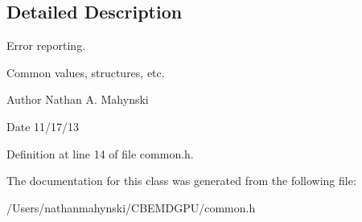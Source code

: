 \subsection{Detailed Description}
Error reporting. 

Common values, structures, etc. \begin{DoxyAuthor}{Author}
Nathan A. Mahynski 
\end{DoxyAuthor}
\begin{DoxyDate}{Date}
11/17/13 
\end{DoxyDate}


Definition at line 14 of file common.\-h.



The documentation for this class was generated from the following file\-:\begin{DoxyCompactItemize}
\item 
/\-Users/nathanmahynski/\-C\-B\-E\-M\-D\-G\-P\-U/common.\-h\end{DoxyCompactItemize}
